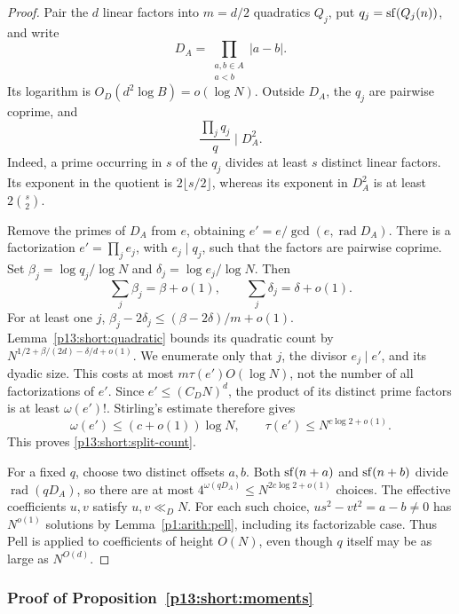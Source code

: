 \begin{proof}
Pair the \(d\) linear factors into \(m=d/2\) quadratics
\(Q_j\), put \(q_j=\sf(Q_j(n))\), and write
\[
 D_A=\prod_{\substack{a,b\in A\\a<b}}|a-b|.
\]
Its logarithm is \(O_D(d^2\log B)=o(\log N)\).
Outside \(D_A\), the \(q_j\) are pairwise coprime, and
\begin{equation}
 \frac{\prod_jq_j}{q}\mid D_A^2.
 \label{p13:short:resultant}
\end{equation}
Indeed, a prime occurring in \(s\) of the \(q_j\) divides at
least \(s\) distinct linear factors. Its exponent in the
quotient is \(2\lfloor s/2\rfloor\), whereas its exponent
in \(D_A^2\) is at least \(2\binom{s}{2}\).

Remove the primes of \(D_A\) from \(e\), obtaining
\(e'=e/\gcd(e,\operatorname{rad}D_A)\).
There is a factorization \(e'=\prod_j e_j\), with
\(e_j\mid q_j\), such that the factors are pairwise coprime.
Set \(\beta_j=\log q_j/\log N\) and
\(\delta_j=\log e_j/\log N\). Then
\[
 \sum_j\beta_j=\beta+o(1),\qquad
 \sum_j\delta_j=\delta+o(1).
\]
For at least one \(j\),
\(\beta_j-2\delta_j\le(\beta-2\delta)/m+o(1)\).
Lemma~\ref{p13:short:quadratic} bounds its quadratic count
by \(N^{1/2+\beta/(2d)-\delta/d+o(1)}\).
We enumerate only that \(j\), the divisor \(e_j\mid e'\),
and its dyadic size. This costs at most
\(m\tau(e')O(\log N)\), not the number of all factorizations
of \(e'\). Since \(e'\le(C_DN)^d\), the product of its distinct
prime factors is at least \(\omega(e')!\). Stirling's estimate
therefore gives
\[
 \omega(e')\le(c+o(1))\log N,\qquad
 \tau(e')\le N^{c\log2+o(1)}.
\]
This proves \eqref{p13:short:split-count}.

For a fixed \(q\), choose two distinct offsets \(a,b\).
Both \(\sf(n+a)\) and \(\sf(n+b)\) divide
\(\operatorname{rad}(qD_A)\), so there are at most
\(4^{\omega(qD_A)}\le N^{2c\log2+o(1)}\) choices.
The effective coefficients \(u,v\) satisfy \(u,v\ll_D N\).
For each such choice,
\(us^2-vt^2=a-b\ne0\) has \(N^{o(1)}\) solutions by
Lemma~\ref{p1:arith:pell}, including its factorizable case.
Thus Pell is applied to coefficients of height \(O(N)\),
even though \(q\) itself may be as large as \(N^{O(d)}\).
\end{proof}

\subsubsection{Proof of Proposition~\ref{p13:short:moments}}
\label{p14:comp:short:moments}

